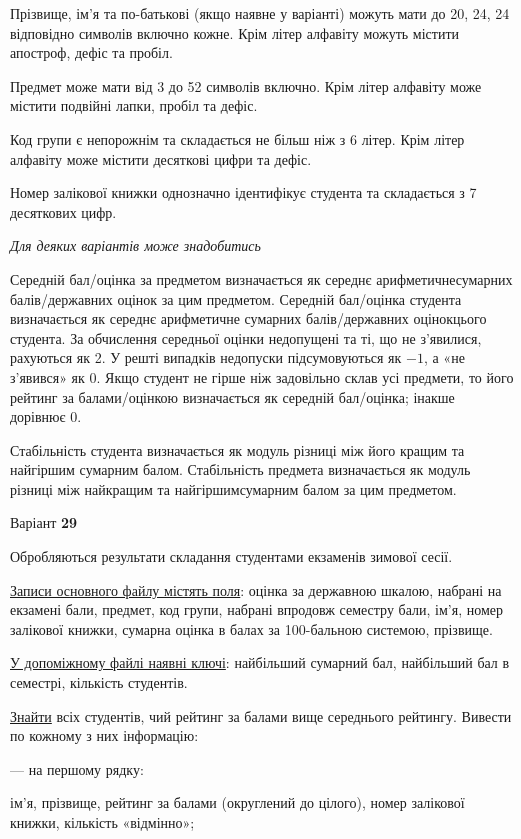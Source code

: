 \documentclass[11pt, ukrainian]{article}
\begin{document}
Прізвище, ім’я та по-батькові (якщо наявне у варіанті) можуть мати до 20, 24, 24 відповідно символів включно кожне. 
Крім літер алфавіту можуть містити апостроф, дефіс та пробіл.

Предмет може мати від 3 до 52 символів включно. 
Крім літер алфавіту може містити подвійні лапки, пробіл та дефіс.

Код групи є непорожнім та складається не більш ніж з 6 літер. 
Крім літер алфавіту може містити десяткові цифри та дефіс.


Номер залікової книжки однозначно ідентифікує студента та складається з 7 десяткових цифр. 

\bigskip\textit{Для деяких варіантів може знадобитись}

Середній бал/оцінка за предметом визначається як середнє арифметичнесумарних балів/державних оцінок за цим предметом. 
Середній бал/оцінка студента визначається як середнє арифметичне сумарних балів/державних оцінокцього студента. 
За обчислення середньої оцінки недопущені та ті, що не з’явилися, рахуються як 2.
У решті випадків недопуски підсумовуються як $-1$, а «не з’явився» як 0.
Якщо студент не гірше ніж задовільно склав усі предмети, 
то його рейтинг за балами/оцінкою визначається як середній бал/оцінка; інакше дорівнює 0.

Стабільність студента визначається як модуль різниці між його кращим та найгіршим сумарним балом.
Стабільність предмета визначається як модуль різниці між найкращим та найгіршимсумарним балом за цим предметом.




\par
\newpage
{\center Варіант  \No \textbf { 29 }\par}
\bigskip
Обробляються результати складання студентами екзаменів зимової сесії.

\underline{Записи основного файлу містять поля}: оцінка за державною шкалою, набрані на екзамені бали, предмет, код групи, набрані впродовж семестру бали, ім’я, номер залікової книжки, сумарна оцінка в балах за 100-бальною системою, прізвище.

\underline{У допоміжному файлі наявні ключі}: найбільший сумарний бал, найбільший бал в семестрі, кількість студентів.

\underline{Знайти} всіх студентів, чий рейтинг за балами вище середнього рейтингу. Вивести по кожному з них інформацію:\par
{\noindent}--- на першому рядку:\par
ім’я, прізвище, рейтинг за балами (округлений до цілого), номер залікової книжки, кількість «відмінно»;
\end{document}
